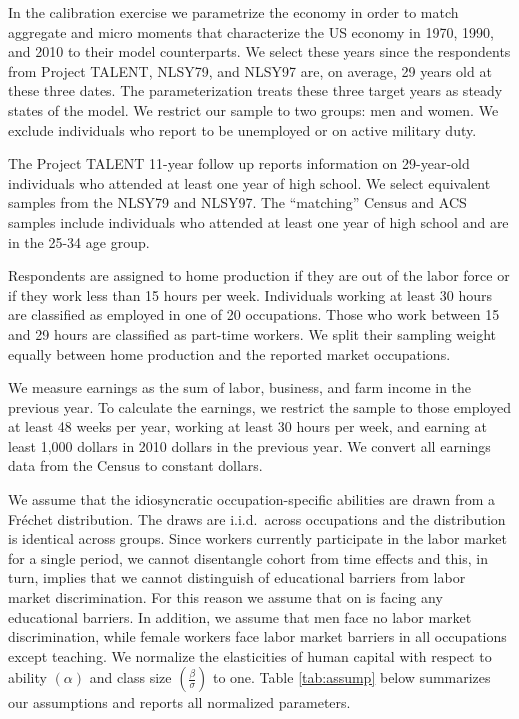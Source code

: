 \documentclass[onehalfspacing,11pt]{article}
\begin{document}
	In the calibration exercise we parametrize the economy in order to match aggregate and micro moments that characterize the US economy in 1970, 1990, and 2010 to their model counterparts. We select these years since the respondents from Project TALENT, NLSY79, and NLSY97 are, on average, 29 years old at these three dates. The parameterization treats these three target years as steady states of the model. We restrict our sample to two groups: men and women. We exclude individuals who report to be unemployed or on active military duty.
	
	The Project TALENT 11-year follow up reports information on 29-year-old individuals who attended at least one year of high school. We select equivalent samples from the NLSY79 and NLSY97. The ``matching'' Census and ACS samples include individuals who attended at least one year of high school and are in the 25-34 age group. 
	
	Respondents are assigned to home production if they are out of the labor force or if they work less than 15 hours per week. Individuals working at least 30 hours are classified as employed in one of 20 occupations. Those who work between 15 and 29 hours are classified as part-time workers. We split their sampling weight equally between home production and the reported market occupations.
	
	We measure earnings as the sum of labor, business, and farm income in the previous year. To calculate the earnings, we restrict the sample to those employed at least 48 weeks per year, working at least 30 hours per week, and earning at least 1,000 dollars in 2010 dollars in the previous year. We convert all earnings data from the Census to constant dollars.
	
	We assume that the idiosyncratic occupation-specific abilities are drawn from a Fr\'echet distribution. The draws are i.i.d.~across occupations and the distribution is identical across groups. Since workers currently participate in the labor market for a single period, we cannot disentangle cohort from time effects and this, in turn, implies that we cannot distinguish of educational barriers from labor market discrimination. For this reason we assume that on is facing any educational barriers. In addition, we assume that men face no labor market discrimination, while female workers face labor market barriers in all occupations except teaching. We normalize the elasticities of human capital  with respect to ability $(\alpha)$ and class size $\left(\frac{\beta}{\sigma}\right)$ to one. Table \ref{tab:assump} below summarizes our assumptions and reports all normalized parameters.
	
\end{document}
